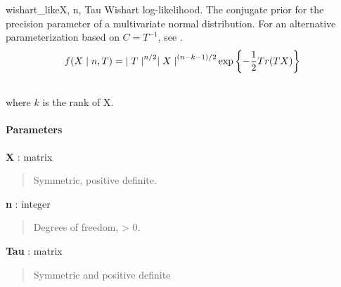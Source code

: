 \begin{funcdesc}{wishart\_like}{X, n, Tau}
\hypertarget{pymc.distributions.wishart_like}{}
Wishart log-likelihood. The conjugate prior for the precision parameter of a multivariate normal distribution. For an alternative parameterization based on $C=T^{-1}$, see
\hyperlink{pymc.distributions.wishart_cov_like}{}.
\begin{gather}
\begin{split}f(X \mid n, T) = {\mid T \mid}^{n/2}{\mid X \mid}^{(n-k-1)/2} \exp\left\{ -\frac{1}{2} Tr(TX) \right\}\end{split}\notag\\\begin{split}\end{split}\notag
\end{gather}
where $k$ is the rank of X.
\paragraph{Parameters}\begin{paramlist}

\item[] \textbf{X} : matrix
\begin{quote}

Symmetric, positive definite.
\end{quote}

\item[] \textbf{n} : integer
\begin{quote}

Degrees of freedom, \textgreater{} 0.
\end{quote}

\item[] \textbf{Tau} : matrix
\begin{quote}

Symmetric and positive definite
\end{quote}
\end{paramlist}
\end{funcdesc}


